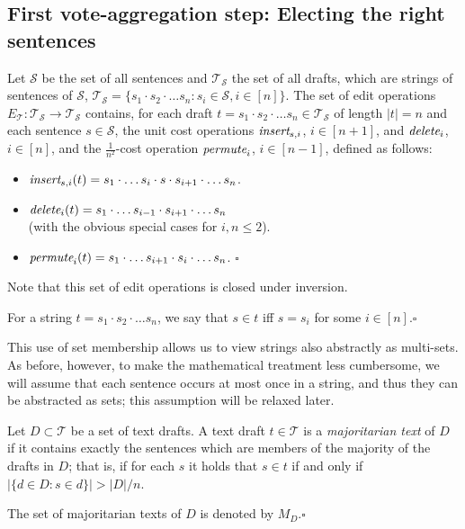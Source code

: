 \documentclass{llncs}
\newcommand{\qqed}{\hfill$\square$}
\newcommand{\calS}{\mathcal{S}}
\newcommand{\calT}{\mathcal{T}}
\newcommand{\iinsert}[1]{\emph{insert}_{#1}}
\newcommand{\ddelete}[1]{\emph{delete}_{#1}}
\newcommand{\permute}[1]{\emph{permute}_{#1}}
\begin{document}
\subsection{First vote-aggregation step: Electing the right sentences}

\begin{definition}
Let $\calS$ be the set of all sentences and $\calT_\calS$ the set of all drafts, which are strings of sentences of $\calS$,   
$\calT_\calS = \{s_1\cdot s_2 \cdot \ldots  s_n : s_i \in \calS, i \in [n]\}$. The set of edit operations $E_\calT: \calT_\calS \rightarrow \calT_\calS$ contains, for each draft $t = s_1\cdot s_2\cdot \ldots s_n \in \calT_\calS$ of length $|t|=n$ and each sentence $s \in \calS$, the unit cost operations $\iinsert{{s, i}}$, $i \in [n + 1]$, and $\ddelete{i}$, $i \in [n]$, and the $\frac{1}{n^2}$-cost operation $\permute{i}$, $i \in [n - 1]$, defined as follows:
%
\begin{itemize}

\item
$\iinsert{{s, i}}(t) = s_1\cdot \ldots s_i\cdot s\cdot s_{i + 1}\cdot \ldots s_n$.


\item
$\ddelete{i}(t) = s_1\cdot \ldots s_{i - 1}\cdot s_{i + 1}\cdot \ldots s_n$ \\
(with the obvious special cases for $i, n \le  2$).

\item
$\permute{i}(t) = s_1\cdot \ldots s_{i+1}\cdot s_i\cdot \ldots s_n$.
\qqed
\end{itemize}
%
\end{definition}

Note that this set of edit operations is closed under inversion.

\begin{definition}\label{definition:string-membership}
For a string $t = s_1\cdot s_2\cdot \ldots s_n$, we say that $s \in t$ iff $s = s_i$ for some $i \in [n]$.\qqed
\end{definition}

This use of set membership allows us to view strings also abstractly as multi-sets.  As before, however, to make the mathematical treatment less cumbersome, we will assume that each sentence occurs at most once in a string, and thus they can be abstracted as sets; this assumption will be relaxed later.

\begin{definition}\label{definition:majoritarian-drafts}
%
Let $D \subset \calT$ be a set of text drafts. A text draft $t \in \calT$ is a \emph{majoritarian text} of $D$ if it contains exactly the sentences which are members of the majority of the drafts in $D$; that is, if for each $s$ it holds that $s \in t$ if and only if $|\{d \in D : s \in d\}| > |D|/n$.

The set of majoritarian texts of $D$ is denoted by $M_D$.\qqed
%
\end{definition}
\end{document}
